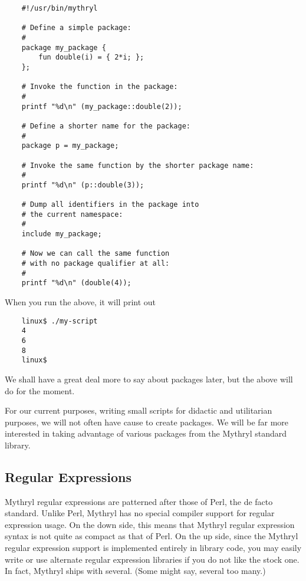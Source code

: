 \begin{verbatim}
    #!/usr/bin/mythryl

    # Define a simple package:
    #
    package my_package {
        fun double(i) = { 2*i; };
    };

    # Invoke the function in the package:
    #
    printf "%d\n" (my_package::double(2));

    # Define a shorter name for the package:
    #
    package p = my_package;

    # Invoke the same function by the shorter package name:
    #
    printf "%d\n" (p::double(3));

    # Dump all identifiers in the package into
    # the current namespace:
    #
    include my_package;

    # Now we can call the same function
    # with no package qualifier at all:
    #
    printf "%d\n" (double(4));
\end{verbatim}

When you run the above, it will print out

\begin{verbatim}
    linux$ ./my-script
    4
    6
    8
    linux$
\end{verbatim}

We shall have a great deal more to say about packages later, 
but the above will do for the moment.

For our current purposes, writing small scripts for didactic and 
utilitarian purposes, we will not often have cause to create packages. 
We will be far more interested in taking advantage of various packages 
from the Mythryl standard library.


\cutend*

\subsection{Regular Expressions}
\label{section:tut:bare-essentials:regex}

Mythryl regular expressions are patterned after those of Perl, the 
de facto standard.  Unlike Perl, Mythryl has no special compiler 
support for regular expression usage.  On the down side, this means 
that Mythryl regular expression syntax is not quite as compact as 
that of Perl.  On the up side, since the Mythryl regular expression support 
is implemented entirely in library code, you may easily write or use 
alternate regular expression libraries if you do not like the stock one. 
In fact, Mythryl ships with several.  (Some might say, several too many.) 

